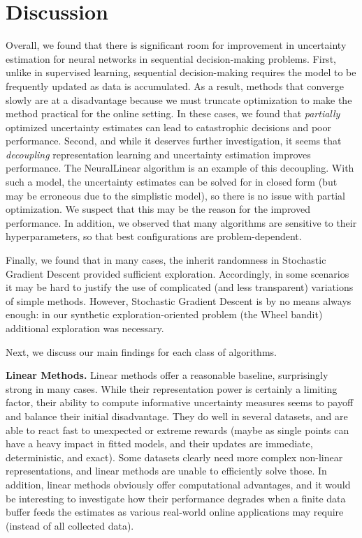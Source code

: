 \documentclass{article} \usepackage{iclr2018_conference,times}
\begin{document}
 \section{Discussion}\label{s:discussion}
Overall, we found that there is significant room for improvement in uncertainty estimation for neural networks in sequential decision-making problems. First, unlike in supervised learning, sequential decision-making requires the model to be frequently updated as data is accumulated. As a result, methods that converge slowly are at a disadvantage because we must truncate optimization to make the method practical for the online setting. In these cases, we found that \emph{partially} optimized uncertainty estimates can lead to catastrophic decisions and poor performance.
Second, and while it deserves further investigation, it seems that \emph{decoupling} representation learning and uncertainty estimation improves performance. The NeuralLinear algorithm is an example of this decoupling. With such a model, the uncertainty estimates can be solved for in closed form (but may be erroneous due to the simplistic model), so there is no issue with partial optimization. We suspect that this may be the reason for the improved performance. In addition, we observed that many algorithms are sensitive to their hyperparameters, so that best configurations are problem-dependent.

Finally, we found that in many cases, the inherit randomness in Stochastic Gradient Descent provided sufficient exploration. Accordingly, in some scenarios it may be hard to justify the use of complicated (and less transparent) variations of simple methods.
However, Stochastic Gradient Descent is by no means always enough: in our synthetic exploration-oriented problem (the Wheel bandit) additional exploration was necessary.

Next, we discuss our main findings for each class of algorithms.

\textbf{Linear Methods.} Linear methods offer a reasonable baseline, surprisingly strong in many cases. While their representation power is certainly a limiting factor, their ability to compute informative uncertainty measures seems to payoff and balance their initial disadvantage.
They do well in several datasets, and are able to react fast to unexpected or extreme rewards (maybe as single points can have a heavy impact in fitted models, and their updates are immediate, deterministic, and exact).
Some datasets clearly need more complex non-linear representations, and linear methods are unable to efficiently solve those.
In addition, linear methods obviously offer computational advantages, and it would be interesting to investigate how their performance degrades when a finite data buffer feeds the estimates as various real-world online applications may require (instead of all collected data).
\end{document}
